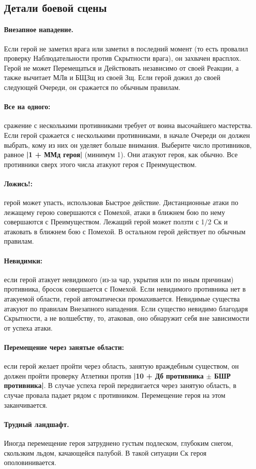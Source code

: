 \subsection{Детали боевой сцены}
\paragraph{Внезапное нападение.} Если герой не заметил врага или заметил в последний момент (то есть провалил проверку Наблюдательности против Скрытности врага), он захвачен врасплох. Герой не может Перемещаться и Действовать независимо от своей Реакции, а также вычитает МЛв и БЩЗщ из своей Зщ. Если герой дожил до своей следующей Очереди, он сражается по обычным правилам.
\paragraph{Все на одного:} сражение с несколькими противниками требует от воина высочайшего мастерства. Если герой сражается с несколькими противниками, в начале Очереди он должен выбрать, кому из них он уделяет больше внимания. Выберите число противников, равное \textbf{|1 + ММд героя|} (минимум 1). Они атакуют героя, как обычно. Все противники сверх этого числа атакуют героя с Преимуществом.
\paragraph{Ложись!:} герой может упасть, использовав Быстрое действие. Дистанционные атаки по лежащему герою совершаются с Помехой, атаки в ближнем бою по нему совершаются с Преимуществом. Лежащий герой может ползти с 1/2 Ск и атаковать в ближнем бою с Помехой. В остальном герой действует по обычным правилам.
\paragraph{Невидимки:} если герой атакует невидимого (из-за чар, укрытия или по иным причинам) противника, бросок совершается с Помехой. Если невидимого противника нет в атакуемой области, герой автоматически промахивается. Невидимые существа атакуют по правилам Внезапного нападения. Если существо невидимо благодаря Скрытности, а не волшебству, то, атаковав, оно обнаружит себя вне зависимости от успеха атаки.
\paragraph{Перемещение через занятые области:} если герой желает пройти через область, занятую враждебным существом, он должен пройти проверку Атлетики против \textbf{|10 + Дб противника $\pm$ БШР противника|}. В случае успеха герой передвигается через занятую область, в случае провала падает рядом с противником. Перемещение героя на этом заканчивается.
\paragraph{Трудный ландшафт.} Иногда перемещение героя затруднено густым подлеском, глубоким снегом, скользким льдом, качающейся палубой. В такой ситуации Ск героя ополовинивается.